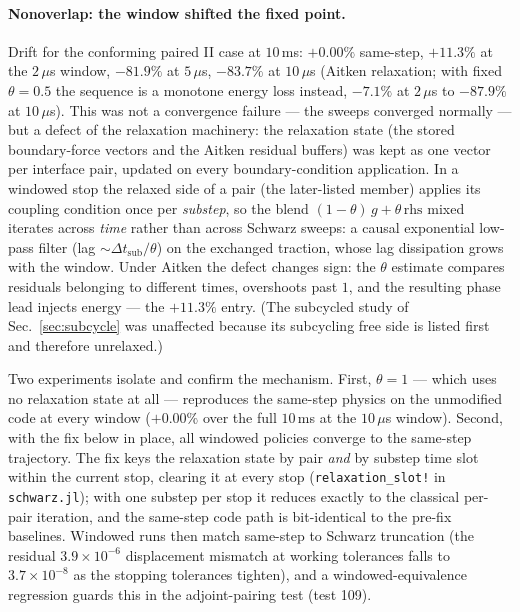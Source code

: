 \documentclass[11pt]{article}
\newcommand{\code}[1]{\texttt{#1}}
\begin{document}
\paragraph{Nonoverlap: the window shifted the fixed point.} Drift for the
conforming paired II case at $10$\,ms: $+0.00\%$ same-step, $+11.3\%$ at
the $2\,\mu$s window, $-81.9\%$ at $5\,\mu$s, $-83.7\%$ at $10\,\mu$s
(Aitken relaxation; with fixed $\theta = 0.5$ the sequence is a monotone
energy loss instead, $-7.1\%$ at $2\,\mu$s to $-87.9\%$ at $10\,\mu$s). This was
not a convergence failure --- the sweeps converged normally --- but a
defect of the relaxation machinery: the relaxation state (the stored
boundary-force vectors and the Aitken residual buffers) was kept as one
vector per interface pair, updated on every boundary-condition
application. In a windowed stop the
relaxed side of a pair (the later-listed member) applies its coupling
condition once per \emph{substep}, so the blend
$(1-\theta)\,g + \theta\,\mathrm{rhs}$ mixed iterates across \emph{time}
rather than across Schwarz sweeps: a causal exponential low-pass filter
(lag $\sim \Delta t_{\mathrm{sub}}/\theta$) on the exchanged traction,
whose lag dissipation grows with the window. Under Aitken the defect
changes sign: the $\theta$ estimate compares residuals belonging to
different times, overshoots past $1$, and the resulting phase lead injects
energy --- the $+11.3\%$ entry. (The subcycled study of
Sec.~\ref{sec:subcycle} was unaffected because its subcycling free side is
listed first and therefore unrelaxed.)

Two experiments isolate and confirm the mechanism. First, $\theta = 1$ ---
which uses no relaxation state at all --- reproduces the same-step physics
on the unmodified code at every window ($+0.00\%$ over the full $10$\,ms at
the $10\,\mu$s window). Second, with the fix below in place, all windowed
policies converge to the same-step trajectory. The fix keys the relaxation
state by pair \emph{and} by substep time slot within the current stop,
clearing it at every stop (\code{relaxation\_slot!} in \code{schwarz.jl});
with one substep per stop it reduces exactly to the classical per-pair
iteration, and the same-step code path is bit-identical to the pre-fix
baselines. Windowed runs then match same-step to Schwarz truncation (the
residual $3.9\times 10^{-6}$ displacement mismatch at working tolerances
falls to $3.7\times 10^{-8}$ as the stopping tolerances tighten), and a
windowed-equivalence regression guards this in the adjoint-pairing test
(test 109).
\end{document}
